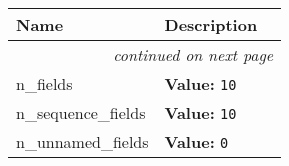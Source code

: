     \vspace{-1cm}
\hspace{\varindent}\begin{longtable}{|p{\varnamewidth}|p{\vardescrwidth}|l}
\cline{1-2}
\cline{1-2} \centering \textbf{Name} & \centering \textbf{Description}& \\
\cline{1-2}
\endhead\cline{1-2}\multicolumn{3}{r}{\small\textit{continued on next page}}\\\endfoot\cline{1-2}
\endlastfoot\raggedright n\-\_\-f\-i\-e\-l\-d\-s\- & \raggedright \textbf{Value:} 
{\tt 10}&\\
\cline{1-2}
\raggedright n\-\_\-s\-e\-q\-u\-e\-n\-c\-e\-\_\-f\-i\-e\-l\-d\-s\- & \raggedright \textbf{Value:} 
{\tt 10}&\\
\cline{1-2}
\raggedright n\-\_\-u\-n\-n\-a\-m\-e\-d\-\_\-f\-i\-e\-l\-d\-s\- & \raggedright \textbf{Value:} 
{\tt 0}&\\
\cline{1-2}
\end{longtable}

